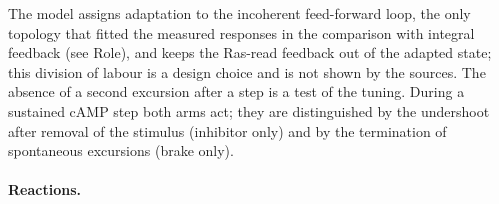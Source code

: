 The model assigns adaptation to the incoherent feed-forward loop, the only topology that fitted the measured responses in the comparison with integral feedback (see Role), and keeps the Ras-read feedback out of the adapted state; this division of labour is a design choice and is not shown by the sources.
The absence of a second excursion after a step is a test of the tuning.
During a sustained cAMP step both arms act; they are distinguished by the undershoot after removal of the stimulus (inhibitor only) and by the termination of spontaneous excursions (brake only).




\paragraph{Reactions.}
